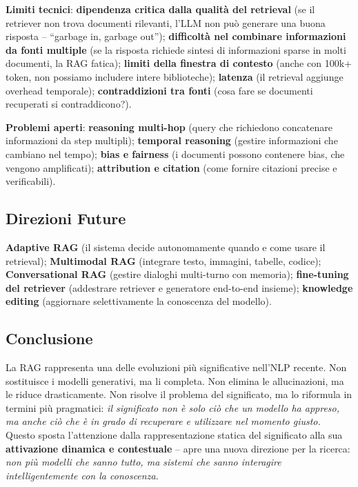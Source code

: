 \documentclass[12pt,a4paper]{article}
\begin{document}
\textbf{Limiti tecnici}: \textbf{dipendenza critica dalla qualit\`a del retrieval} (se il retriever non trova documenti rilevanti, l'LLM non pu\`o generare una buona risposta -- ``garbage in, garbage out''); \textbf{difficolt\`a nel combinare informazioni da fonti multiple} (se la risposta richiede sintesi di informazioni sparse in molti documenti, la RAG fatica); \textbf{limiti della finestra di contesto} (anche con 100k+ token, non possiamo includere intere biblioteche); \textbf{latenza} (il retrieval aggiunge overhead temporale); \textbf{contraddizioni tra fonti} (cosa fare se documenti recuperati si contraddicono?).

\textbf{Problemi aperti}: \textbf{reasoning multi-hop} (query che richiedono concatenare informazioni da step multipli); \textbf{temporal reasoning} (gestire informazioni che cambiano nel tempo); \textbf{bias e fairness} (i documenti possono contenere bias, che vengono amplificati); \textbf{attribution e citation} (come fornire citazioni precise e verificabili).

\subsection{Direzioni Future}

\textbf{Adaptive RAG} (il sistema decide autonomamente quando e come usare il retrieval); \textbf{Multimodal RAG} (integrare testo, immagini, tabelle, codice); \textbf{Conversational RAG} (gestire dialoghi multi-turno con memoria); \textbf{fine-tuning del retriever} (addestrare retriever e generatore end-to-end insieme); \textbf{knowledge editing} (aggiornare selettivamente la conoscenza del modello).

\subsection{Conclusione}

\begin{quizbox}
La RAG rappresenta una delle evoluzioni pi\`u significative nell'NLP recente. Non sostituisce i modelli generativi, ma li completa. Non elimina le allucinazioni, ma le riduce drasticamente. Non risolve il problema del significato, ma lo riformula in termini pi\`u pragmatici: \emph{il significato non \`e solo ci\`o che un modello ha appreso, ma anche ci\`o che \`e in grado di recuperare e utilizzare nel momento giusto.} Questo sposta l'attenzione dalla rappresentazione statica del significato alla sua \textbf{attivazione dinamica e contestuale} -- apre una nuova direzione per la ricerca: \emph{non pi\`u modelli che sanno tutto, ma sistemi che sanno interagire intelligentemente con la conoscenza.}
\end{quizbox}
\end{document}
